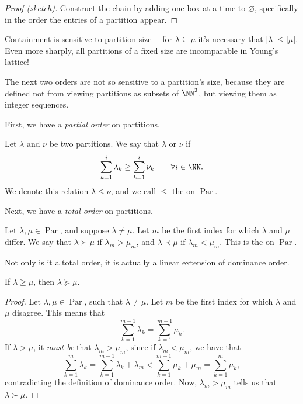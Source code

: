 \documentclass{article}
\DeclareMathOperator{\Par}{Par}
\begin{document}
\begin{proof}[Proof (sketch)]
    Construct the chain by adding one box at a time to $\varnothing$, specifically in the order the entries of a partition appear.
\end{proof}

Containment is sensitive to partition size--- for $\lambda \subseteq \mu$ it's necessary that $|\lambda| \leq |\mu|$.
Even more sharply, all partitions of a fixed size are incomparable in Young's lattice!

The next two orders are not so sensitive to a partition's size, because they are defined not from viewing partitions as subsets of $\NN^2$, but viewing them as integer sequences.

First, we have a \textit{partial order} on partitions.

\begin{definition}
    Let $\lambda$ and $\nu$ be two partitions. We say that $\lambda$  or  $\nu$ if
    \[
        \sum_{k=1}^i \lambda_k \geq \sum_{k=1}^i \nu_k \qquad \forall i\in\NN.
    \]
    We denote this relation $\lambda \leq \nu$, and we call $\leq$ the  on $\Par$.
\end{definition}

Next, we have a \textit{total order} on partitions.

\begin{definition}
    Let $\lambda, \mu \in \Par$, and suppose $\lambda \neq \mu$.
    Let $m$ be the first index for which $\lambda$ and $\mu$ differ.
    We say that $\lambda \succ \mu$ if $\lambda_m > \mu_m$, and $\lambda \prec \mu$ if $\lambda_m < \mu_m$.
    This is the  on $\Par$.
\end{definition}

Not only is it a total order, it is actually a linear extension of dominance order.

\begin{theorem}
    If $\lambda \geq \mu$, then $\lambda \succeq \mu$.
\end{theorem}

\begin{proof}
    Let $\lambda, \mu \in \Par$, such that $\lambda \neq \mu$.
    Let $m$ be the first index for which $\lambda$ and $\mu$ disagree.
    This means that
    \[
        \sum_{k=1}^{m-1} \lambda_k = \sum_{k=1}^{m-1} \mu_k.
    \]
    If $\lambda > \mu$, it \textit{must be} that $\lambda_m > \mu_m$, since if $\lambda_m < \mu_m$, we have that
    \[
        \sum_{k=1}^m \lambda_k = \sum_{k=1}^{m-1} \lambda_k + \lambda_m < \sum_{k=1}^{m-1} \mu_k + \mu_m = \sum_{k=1}^m \mu_k,
    \]
    contradicting the definition of dominance order.
    Now, $\lambda_m > \mu_m$ tells us that $\lambda \succ \mu$.
\end{proof}
\end{document}
